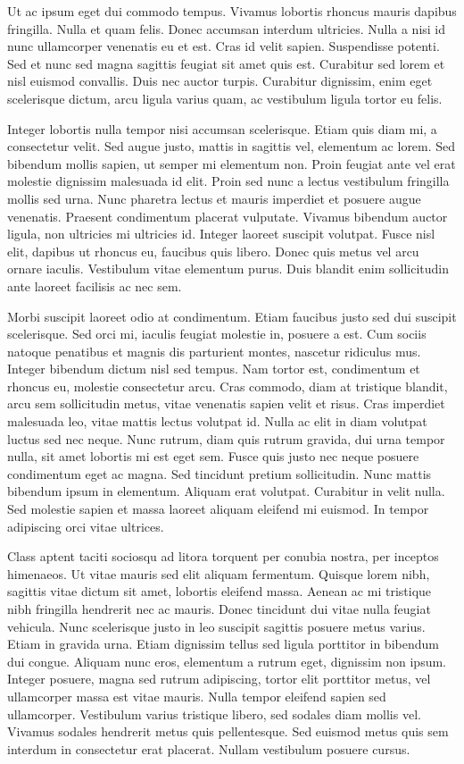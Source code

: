 Ut ac ipsum eget dui commodo tempus.
Vivamus lobortis rhoncus mauris dapibus fringilla.
Nulla et quam felis.
Donec accumsan interdum ultricies.
Nulla a nisi id nunc ullamcorper venenatis eu et est.
Cras id velit sapien.
Suspendisse potenti.
Sed et nunc sed magna sagittis feugiat sit amet quis est.
Curabitur sed lorem et nisl euismod convallis.
Duis nec auctor turpis.
Curabitur dignissim, enim eget scelerisque dictum, arcu ligula varius quam, ac vestibulum ligula tortor eu felis.

Integer lobortis nulla tempor nisi accumsan scelerisque.
Etiam quis diam mi, a consectetur velit.
Sed augue justo, mattis in sagittis vel, elementum ac lorem.
Sed bibendum mollis sapien, ut semper mi elementum non.
Proin feugiat ante vel erat molestie dignissim malesuada id elit.
Proin sed nunc a lectus vestibulum fringilla mollis sed urna.
Nunc pharetra lectus et mauris imperdiet et posuere augue venenatis.
Praesent condimentum placerat vulputate.
Vivamus bibendum auctor ligula, non ultricies mi ultricies id.
Integer laoreet suscipit volutpat.
Fusce nisl elit, dapibus ut rhoncus eu, faucibus quis libero.
Donec quis metus vel arcu ornare iaculis.
Vestibulum vitae elementum purus.
Duis blandit enim sollicitudin ante laoreet facilisis ac nec sem.

Morbi suscipit laoreet odio at condimentum.
Etiam faucibus justo sed dui suscipit scelerisque.
Sed orci mi, iaculis feugiat molestie in, posuere a est.
Cum sociis natoque penatibus et magnis dis parturient montes, nascetur ridiculus mus.
Integer bibendum dictum nisl sed tempus.
Nam tortor est, condimentum et rhoncus eu, molestie consectetur arcu.
Cras commodo, diam at tristique blandit, arcu sem sollicitudin metus, vitae venenatis sapien velit et risus.
Cras imperdiet malesuada leo, vitae mattis lectus volutpat id.
Nulla ac elit in diam volutpat luctus sed nec neque.
Nunc rutrum, diam quis rutrum gravida, dui urna tempor nulla, sit amet lobortis mi est eget sem.
Fusce quis justo nec neque posuere condimentum eget ac magna.
Sed tincidunt pretium sollicitudin.
Nunc mattis bibendum ipsum in elementum.
Aliquam erat volutpat.
Curabitur in velit nulla.
Sed molestie sapien et massa laoreet aliquam eleifend mi euismod.
In tempor adipiscing orci vitae ultrices.

Class aptent taciti sociosqu ad litora torquent per conubia nostra, per inceptos himenaeos.
Ut vitae mauris sed elit aliquam fermentum.
Quisque lorem nibh, sagittis vitae dictum sit amet, lobortis eleifend massa.
Aenean ac mi tristique nibh fringilla hendrerit nec ac mauris.
Donec tincidunt dui vitae nulla feugiat vehicula.
Nunc scelerisque justo in leo suscipit sagittis posuere metus varius.
Etiam in gravida urna.
Etiam dignissim tellus sed ligula porttitor in bibendum dui congue.
Aliquam nunc eros, elementum a rutrum eget, dignissim non ipsum.
Integer posuere, magna sed rutrum adipiscing, tortor elit porttitor metus, vel ullamcorper massa est vitae mauris.
Nulla tempor eleifend sapien sed ullamcorper.
Vestibulum varius tristique libero, sed sodales diam mollis vel.
Vivamus sodales hendrerit metus quis pellentesque.
Sed euismod metus quis sem interdum in consectetur erat placerat.
Nullam vestibulum posuere cursus.

